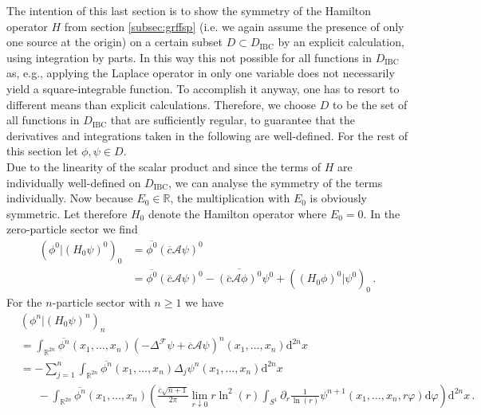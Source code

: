 The intention of this last section is to show the symmetry of the Hamilton operator $H$ from section \ref{subsec:grffsp} (i.e. we again assume the presence of only one source at the origin) on a certain subset $D \subset D_{\textrm{IBC}}$ by an explicit calculation, using integration by parts. In this way this not possible for all functions in $D_{\textrm{IBC}}$ as, e.g., applying the Laplace operator in only one variable does not necessarily yield a square-integrable function. To accomplish it anyway, one has to resort to different means than explicit calculations. Therefore, we choose $D$ to be the set of all functions in $D_{\textrm{IBC}}$ that are sufficiently regular, to guarantee that the derivatives and integrations taken in the following are well-defined. For the rest of this section let $\phi,\psi \in D$.
\\
Due to the linearity of the scalar product and since the terms of $H$ are individually well-defined on $D_{\textrm{IBC}}$, we can analyse the symmetry of the terms individually. Now because $E_{0} \in \mathbb{R}$, the multiplication with $E_{0}$ is obviously symmetric. Let therefore $H_{0}$ denote the Hamilton operator where $E_{0} = 0$. In the zero-particle sector we find
\begin{align*}
  \left(
      \phi^{0}
    \vert
      (H_{0}\psi)^{0}
  \right)_{0}
  &=
  \overline{\phi^{0}}
  (\overline{c}\mathcal{A}\psi)^{0}
  \\
  &=
  \overline{\phi^{0}}
  (\overline{c}\mathcal{A}\psi)^{0}
  -
  \overline{(\overline{c}\mathcal{A}\phi)^{0}}
  \psi^{0}
  +
  \left(
      (H_{0}\phi)^{0}
    \vert
      \psi^{0}
  \right)_{0}
  \,.
\end{align*}
For the $n$-particle sector with $n \geq 1$ we have
\begin{align*}
  &
  \left(
      \phi^{n}
    \vert
      (H_{0}\psi)^{n}
  \right)_{n}
  \\
  &=
  \int_{\mathbb{R}^{2n}}
  \overline{\phi^{n}}
  \left(
    x_{1}
    ,
    \dots
    ,
    x_{n}
  \right)
  \left(
    -
    \Delta^{\mathcal{F}}
    \psi
    +
    \overline{c}
    \mathcal{A}
    \psi
  \right)^{n}
  \left(
    x_{1}
    ,
    \dots
    ,
    x_{n}
  \right)
  \mathrm{d}^{2n}x
  \\
  &=
  -
  \sum_{j = 1}^{n}
  \int_{\mathbb{R}^{2n}}
  \overline{\phi^{n}}(x_{1},\dots,x_{n})
  \Delta_{j}
  \psi^{n}(x_{1},\dots,x_{n})
  \mathrm{d}^{2n}x
  \\
  &\phantom{=\ }
  -
  \int_{\mathbb{R}^{2n}}
  \overline{\phi^{n}}
  \left(
    x_{1}
    ,
    \dots
    ,
    x_{n}
  \right)
  \left(
    \frac{\overline{c}\sqrt{n + 1}}{2\pi}
    \lim_{r \downarrow 0}
    r
    \ln^{2}(r)
    \int_{S^{1}}
    \partial_{r}
    \frac{1}{\ln(r)}
    \psi^{n+1}(x_{1},\dots,x_{n},r\varphi)
    \mathrm{d}\varphi
  \right)
  \mathrm{d}^{2n}x
  \,.
\end{align*}
